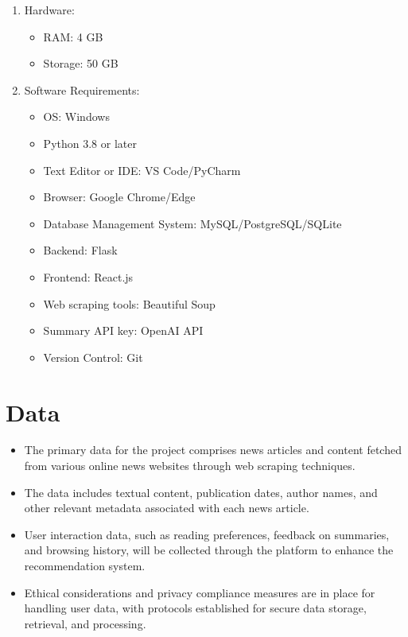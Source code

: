 \documentclass[a4paper]{article}
\begin{document}
\begin{enumerate}
    \item Hardware:
    \begin{itemize}
        \item RAM: 4 GB
        \item Storage: 50 GB
    \end{itemize}
    \item Software Requirements:
    \begin{itemize}
        \item OS: Windows
        \item Python 3.8 or later
        \item Text Editor or IDE: VS Code/PyCharm
        \item Browser: Google Chrome/Edge
        \item Database Management System: MySQL/PostgreSQL/SQLite
        \item Backend: Flask
        \item Frontend: React.js
        \item Web scraping tools: Beautiful Soup
        \item Summary API key: OpenAI API
        \item Version Control: Git
    \end{itemize}
\end{enumerate}

\section{Data}

\begin{itemize}
    \item The primary data for the project comprises news articles and content fetched from various online news websites through web scraping techniques.
    \item The data includes textual content, publication dates, author names, and other relevant metadata associated with each news article.
    \item User interaction data, such as reading preferences, feedback on summaries, and browsing history, will be collected through the platform to enhance the recommendation system.
    \item Ethical considerations and privacy compliance measures are in place for handling user data, with protocols established for secure data storage, retrieval, and processing.
\end{itemize}
\end{document}
